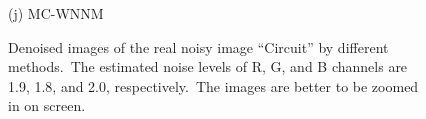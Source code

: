 \documentclass[10pt,onecolumn,letterpaper]{article}
\begin{document}
\begin{figure}[!htbp]
{\begin{minipage}[t]{0.3\textwidth}
{\footnotesize (j) MC-WNNM  }
\end{minipage}
}
\vspace{-1mm}
\caption{Denoised images of the real noisy image ``Circuit'' \cite{ncwebsite} by different methods.\ The estimated noise levels of R, G, and B channels are 1.9, 1.8, and 2.0, respectively.\ The images are better to be zoomed in on screen.}
\label{f9}
\end{figure}


\begin{figure}[!htbp]
\centering
\vspace{-2mm}
\vspace{-4mm}
\end{figure}
\end{document}
